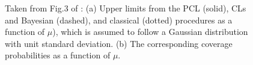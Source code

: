\documentclass{cernrep}
\begin{document}
\begin{figure}[htb]
  \begin{center}
  \end{center}
\vspace*{-0.5cm}
\caption{Taken from Fig.3 of \cite{2011arXiv1105.3166C}: (a) Upper limits from the PCL (solid), CLs and Bayesian (dashed), and classical (dotted) procedures as a function of $\mu$), which is assumed to follow a Gaussian distribution with unit standard deviation. (b) The corresponding coverage probabilities as a function of $\mu$.}
  \label{fig:CLscoverage}
\end{figure}

%
%

%


%



\end{document}
